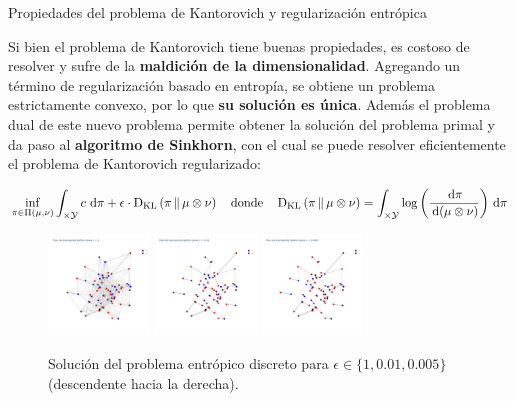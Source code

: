 \documentclass[final]{beamer}
\newlength{\colwidth}
\begin{document}
\begin{frame}[t]
\begin{columns}[t]
\begin{column}{\colwidth}
\begin{block}{Propiedades del problema de Kantorovich y regularización entrópica}


        Si bien el problema de Kantorovich tiene buenas propiedades, es costoso de resolver y sufre de la \textbf{maldición de la dimensionalidad}. Agregando un término de regularización basado en entropía, se obtiene un problema estrictamente convexo, por lo que \textbf{su solución es única}. Además el problema dual de este nuevo problema permite obtener la solución del problema primal y da paso al \textbf{algoritmo de Sinkhorn}, con el cual se puede resolver eficientemente el problema de Kantorovich regularizado:

        \begin{equation*}
          \inf_{\pi\in\Pi(\mu,\nu)}  \int_{\times\mathcal{Y}} c \,\operatorname{d}\!\pi + \epsilon\cdot \operatorname{D_{KL}}\left(\pi\,\|\,\mu\otimes\nu\right)
          \quad\text{donde}
          \quad \operatorname{D_{KL}}\left(\pi\,\|\,\mu\otimes\nu\right) = \int_{\times\mathcal{Y}} \log\left(\frac{\,\operatorname{d}\!\pi}{\,\operatorname{d}\!\,(\mu\otimes\nu)}\right) \,\operatorname{d}\! \pi
        \end{equation*}

        \begin{figure}
          \centering
          \includegraphics[width=0.24\textwidth]{images/discrete_sinkhorn_graph1}
          \includegraphics[width=0.24\textwidth]{images/discrete_sinkhorn_graph0.01}
          \includegraphics[width=0.24\textwidth]{images/discrete_sinkhorn_graph0.005}
          \caption{Solución del problema entrópico discreto para $\epsilon\in\{1, 0.01, 0.005\}$ (descendente hacia la derecha).}
        \end{figure}


\end{block}
\end{column}
\end{columns}
\end{frame}
\end{document}
